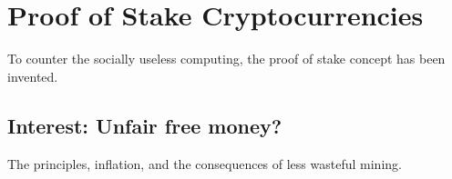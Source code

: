 
\chapter{Proof of Stake Cryptocurrencies}

To counter the socially useless computing, the proof of stake concept
has been invented.


\section*{Interest: Unfair free money?}

The principles, inflation, and the consequences of less wasteful mining.
